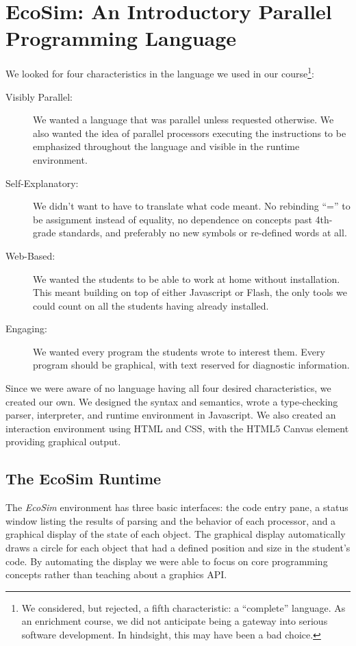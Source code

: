 \documentclass{sig-alternate}
\newcommand{\EcoSim}{\emph{EcoSim}}
\begin{document}
\section{EcoSim: An Introductory Parallel Programming Language}
We looked for four characteristics in the language we used in our course\footnote{
We considered, but rejected, a fifth characteristic: a ``complete'' language.
As an enrichment course, we did not anticipate being a gateway into serious software development.
In hindsight, this may have been a bad choice.
}:
\begin{description}
	\item[Visibly Parallel:]
		We wanted a language that was parallel unless requested otherwise.
		We also wanted the idea of parallel processors executing the instructions
		to be emphasized throughout the language and visible in the runtime environment.
	\item[Self-Explanatory:]
		We didn't want to have to translate what code meant.
		No rebinding ``='' to be assignment instead of equality,
		no dependence on concepts past 4th-grade standards,
		and preferably no new symbols or re-defined words at all.
	\item[Web-Based:]
		We wanted the students to be able to work at home without installation.
		This meant building on top of either Javascript or Flash, 
		the only tools we could count on all the students having already installed.
	\item[Engaging:]
		We wanted every program the students wrote to interest them.
		Every program should be graphical, with text reserved for diagnostic information.
\end{description}

Since we were aware of no language having all four desired characteristics, 
we created our own.
We designed the syntax and semantics, 
wrote a type-checking parser, interpreter, and runtime environment in Javascript.
We also created an interaction environment using HTML and CSS, with the HTML5 Canvas element providing graphical output.

\subsection{The EcoSim Runtime}\label{sec:runtime}
The \EcoSim{} environment has three basic interfaces:
the code entry pane, 
a status window listing the results of parsing and the behavior of each processor,
and a graphical display of the state of each object.
The graphical display automatically draws a circle for each object
that had a defined position and size in the student's code.
By automating the display 
we were able to focus on core programming concepts
rather than teaching about a graphics API.
\end{document}
